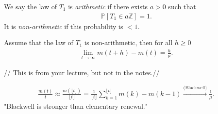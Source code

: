 {\color{blue}
\begin{defn}
	We say the law of $T_1$ is \emph{arithmetic} if there exists $a > 0$ such that 
\begin{align}
	\mathbb{P}_{} \left[ T_1 \in a \mathbb{Z} \right] =1.
\end{align}
	It is \emph{non-arithmetic} if this probability is $<1$.
\end{defn}
}

\begin{theorem}
	Assume that the law of $T_1$ is non-arithmetic, then for all $h\geq 0$
	\begin{align}
	\boxed{ \lim_{t \to \infty} m(t+h)-m(t) = \frac{h}{\mu }.}
	\end{align}
	
\end{theorem}

{\color{blue} // This is from your lecture, but not in the notes.//
\begin{rmk}[]
	\begin{align}
		 \frac{m(t)}{t} \approx \frac{m(\lfloor t \rfloor)}{\lfloor t \rfloor} = \frac{1}{\lfloor t \rfloor} \sum_{k=1}^{\lfloor t \rfloor} m(k) - m(k-1) \stackrel{\textrm{(Blackwell)}}{\to} \frac{1}{\mu}. 
	\end{align}
	"Blackwell is stronger than elementary renewal."
\end{rmk} }

